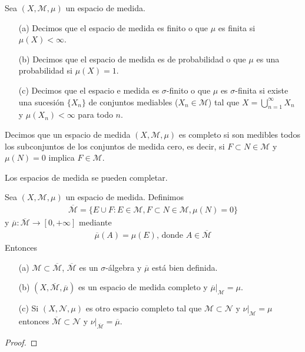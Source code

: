 \begin{defi}
Sea $(X, \mathcal{M}, \mu)$ un espacio de medida.
\begin{enumerate}
    \item[(a)] Decimos que el espacio de medida es finito o que $\mu$ es finita si $\mu(X) < \infty$.
    \item[(b)] Decimos que el espacio de medida es de probabilidad o que $\mu$ es una probabilidad si $\mu(X) = 1$.
    \item[(c)] Decimos que el espacio e medida es $\sigma$-finito o que $\mu$ es $\sigma$-finita si existe una sucesión $\{ X_n \}$ de conjuntos mediables ($X_n \in \mathcal{M}$) tal que  $X = \bigcup_{n=1}^{\infty}{X_n}$ y $\mu(X_n) < \infty$ para todo $n$.
\end{enumerate}
\end{defi}
\begin{defi}
Decimos que un espacio de medida $(X, \mathcal{M}, \mu)$ es completo si son medibles todos los subconjuntos de los conjuntos de medida cero, es decir, si $F \subset N \in \mathcal{M}$ y $\mu(N) = 0$ implica $F \in \mathcal{M}$.
\end{defi}
Los espacios de medida se pueden completar.
\begin{teo}
\label{teo:completar}
Sea $(X, \mathcal{M}, \mu)$ un espacio de medida. Definimos
\begin{align*}
    \overline{\mathcal{M}} = \{ E \cup F : E \in \mathcal{M}, F \subset N \in \mathcal{M}, \mu(N) = 0\}
\end{align*}
y $\overline{\mu}: \overline{\mathcal{M}} \longrightarrow [0, +\infty]$ mediante
\begin{align*}
    \overline{\mu}(A) = \mu(E) \text{, donde } A \in \overline{\mathcal{M}}
\end{align*}
Entonces
\begin{enumerate}
    \item[(a)] $\mathcal{M} \subset \overline{\mathcal{M}}$, $\overline{\mathcal{M}}$ es un $\sigma$-álgebra y $\overline{\mu}$ está bien definida.
    \item[(b)] $(X, \mathcal{\overline{M}}, \overline{\mu})$ es un espacio de medida completo y $\overline{\mu}|_{\mathcal{M}} = \mu$.
    \item[(c)] Si $(X, \mathcal{N}, \mu)$ es otro espacio completo tal que $\mathcal{M} \subset \mathcal{N}$ y $\nu |_{\mathcal{M}} = \mu$ entonces $\overline{\mathcal{M}} \subset \mathcal{N}$ y $\nu |_{\overline{\mathcal{M}}} = \overline{\mu}$.
\end{enumerate}
\end{teo}
\begin{proof}

\end{proof}

